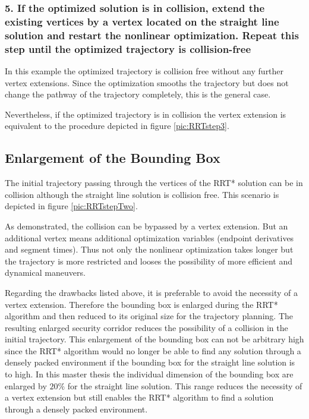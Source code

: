 \subsubsection{5. If the optimized solution is in collision, extend the existing vertices by a vertex located on the straight line solution and restart the nonlinear optimization. Repeat this step until the optimized trajectory is collision-free}
In this example the optimized trajectory is collision free without any further vertex extensions. Since the optimization smooths the trajectory but does not change the pathway of the trajectory completely, this is the general case. \newline

Nevertheless, if the optimized trajectory is in collision the vertex extension is equivalent to the procedure depicted in figure \ref{pic:RRTstep3}.

\subsection{Enlargement of the Bounding Box}\label{sec:enlargementBBX}

The initial trajectory passing through the vertices of the RRT* solution can be in collision although the straight line solution is collision free. This scenario is depicted in figure \ref{pic:RRTstepTwo}. \newpage

As demonstrated, the collision can be bypassed by a vertex extension. But an additional vertex means additional optimization variables (endpoint derivatives and segment times). Thus not only the nonlinear optimization takes longer but the trajectory is more restricted and looses the possibility of more efficient and dynamical maneuvers.  \newline

Regarding the drawbacks listed above, it is preferable to avoid the necessity of a vertex extension. Therefore the bounding box is enlarged during the RRT* algorithm and then reduced to its original size for the trajectory planning. The resulting enlarged security corridor reduces the possibility of a collision in the initial trajectory. This enlargement of the bounding box can not be arbitrary high since the RRT* algorithm would no longer be able to find any solution through a densely packed environment if the bounding box for the straight line solution is to high. \newline
In this master thesis the individual dimension of the bounding box are enlarged by $20\%$ for the straight line solution. This range reduces the necessity of a vertex extension but still enables the RRT* algorithm to find a solution through a densely packed environment.
%

